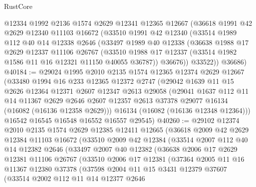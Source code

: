 \begin{lexlean}{RustCore}
\begin{coremodule}
    @12334
    @1992
    @2136
    @1574
    @2629
    @12341
    @12365
    @12667
    (@36618
      @1991
      @42
      @2629
      @12340
      @11103
      @16672
      (@33510
        @1991
        @42
        @12340
        (@33514
          @1989
          @112
          @40
          @14
          @12338
          @2646
          (@33497
            @1989
            @40
            @12338
            (@36638
              @1988
              @17
              @2629
              @12337
              @11106
              @26767
              (@33510 @1988 @17 @12337 (@33514 @1982 @1586 @11 @16 @12321 @11150 @40055 @36787))
              @36676))
          @33522))
      @36686)
@40184 := @29024
    @1995
    @2010
    @2135
    @1574
    @12365
    @12374
    @2629
    @12667
    (@33480
      @1994
      @16
      @233
      @12365
      @12372
      @2747
      (@29042
        @1639
        @11
        @15
        @2626
        @12364
        @12371
        @2607
        @12347
        @2613
        @29058
        (@29041
          @1637
          @112
          @11
          @14
          @11367
          @2629
          @2646
          @2607
          @12357
          @2613
          @37378
          @29077
          @16134
          (@16082 (@16136 @12358 @2629)))
        @16134
        (@16082 (@16136 @12348 @12364)))
      @16542
      @16545
      @16548
      @16552
      @16557
      @29545)
@40260 := @29102
    @12374
    @2010
    @2135
    @1574
    @2629
    @12385
    @12411
    @12665
    (@36618
      @2009
      @42
      @2629
      @12384
      @11103
      @16672
      (@33510
        @2009
        @42
        @12384
        (@33514
          @2007
          @112
          @40
          @14
          @12382
          @2646
          (@33497
            @2007
            @40
            @12382
            (@36638
              @2006
              @17
              @2629
              @12381
              @11106
              @26767
              (@33510
                @2006
                @17
                @12381
                (@37364
                  @2005
                  @11
                  @16
                  @11367
                  @12380
                  @37378
                  (@37598
                    @2004
                    @11
                    @15
                    @3431
                    @12379
                    @37607
                    (@33514
                      @2002
                      @112
                      @11
                      @14
                      @12377
                      @2646

\end{coremodule}
\end{lexlean}
